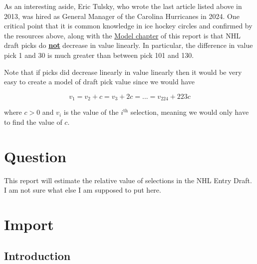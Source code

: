 \documentclass[
  letterpaper,
  DIV=11,
  numbers=noendperiod]{scrreprt}
\begin{document}
As an interesting aside, Eric Tulsky, who wrote the last article listed
above in 2013, was hired as General Manager of the Carolina Hurricanes
in 2024. One critical point that it is common knowledge in ice hockey
circles and confirmed by the resources above, along with the
\href{https://trevsteu.github.io/Stat468_Final/model.html}{Model
chapter} of this report is that NHL draft picks do \ul{\textbf{not}}
decrease in value linearly. In particular, the difference in value pick
1 and 30 is much greater than between pick 101 and 130.

Note that if picks did decrease linearly in value linearly then it would
be very easy to create a model of draft pick value since we would have

\[
v_1 = v_2 + c = v_3 + 2c = ... = v_{224} + 223c
\]

where \(c > 0\) and \(v_i\) is the value of the \(i^{\text{th}}\)
selection, meaning we would only have to find the value of \(c\).


\chapter{Question}\label{question}

This report will estimate the relative value of selections in the NHL
Entry Draft. I am not sure what else I am supposed to put here.


\chapter{Import}\label{import}

\section{Introduction}\label{introduction}
\end{document}
